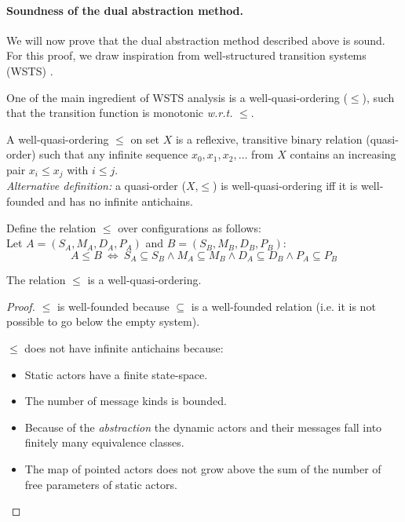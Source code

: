 \documentclass[a4paper]{report}
\numberwithin{algorithm}{chapter}
\begin{document}
\paragraph{Soundness of the dual abstraction method.}
We will now prove that the dual abstraction method described above is sound.
For this proof, we draw inspiration from well-structured transition systems (WSTS) \cite{DBLP:conf/lics/AbdullaCJT96,DBLP:journals/tcs/FinkelS01}.

One of the main ingredient of WSTS analysis is a well-quasi-ordering ($\leq$), such that the transition function is monotonic \emph{w.r.t.} $\leq$.

\begin{define}
A well-quasi-ordering $\leq$ on set $X$ is a reflexive, transitive binary relation (quasi-order) such that any infinite sequence $x_0,x_1,x_2,\ldots$ from $X$ contains an increasing pair $x_i \leq x_j$ with $i \leq j$.\\
\emph{Alternative definition:} a quasi-order ($X$,$\leq$) is well-quasi-ordering iff it is well-founded and has no infinite antichains.
\end{define}

\begin{define}[$\leq$]
\label{defLeq}
Define the relation $\leq$ over configurations as follows:\\
Let $A = (S_A, M_A, D_A, P_A)$ and $B = (S_B, M_B, D_B, P_B)$:
\begin{equation*}
A \leq B ~ \Leftrightarrow ~ S_A \subseteq S_B \land M_A \subseteq M_B \land D_A \subseteq D_B \land P_A \subseteq P_B
\end{equation*}
\end{define}

\begin{proposition}
The relation $\leq$ is a well-quasi-ordering.
\end{proposition}
\begin{proof}
$\leq$ is well-founded because $\subseteq$ is a well-founded relation (i.e. it is not possible to go below the empty system).

\noindent
$\leq$ does not have infinite antichains because:
\begin{itemize}
\item Static actors have a finite state-space.
\item The number of message kinds is bounded.
\item Because of the \emph{abstraction} the dynamic actors and their messages fall into finitely many equivalence classes.
\item The map of pointed actors does not grow above the sum of the number of free parameters of static actors.
\end{itemize}
\end{proof}
\end{document}
